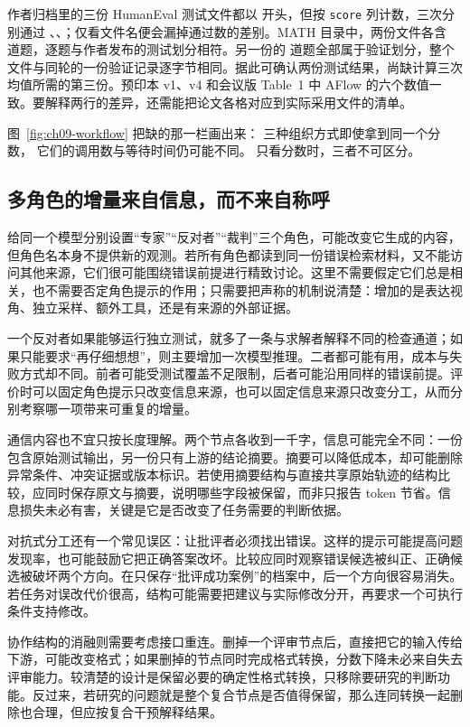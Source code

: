 作者归档里的三份 HumanEval 测试文件都以  开头，但按 \texttt{score} 列计数，三次分别通过 、、；仅看文件名便会漏掉通过数的差别。MATH 目录中，两份文件各含  道题，逐题与作者发布的测试划分相符。另一份的  道题全部属于验证划分，整个文件与同轮的一份验证记录逐字节相同。据此可确认两份测试结果，尚缺计算三次均值所需的第三份。预印本 v1、v4 和会议版 Table~1 中 AFlow 的六个数值一致。要解释两行的差异，还需能把论文各格对应到实际采用文件的清单\cite{aflow-2410,aflow-code-2025}。



图~\ref{fig:ch09-workflow} 把缺的那一栏画出来：
三种组织方式即使拿到同一个分数，
它们的调用数与等待时间仍可能不同。
只看分数时，三者不可区分。


\subsection{多角色的增量来自信息，而不来自称呼}
\label{sec:ch09-roleinformation}

给同一个模型分别设置“专家”“反对者”“裁判”三个角色，可能改变它生成的内容，但角色名本身不提供新的观测。若所有角色都读到同一份错误检索材料，又不能访问其他来源，它们很可能围绕错误前提进行精致讨论。这里不需要假定它们总是相关，也不需要否定角色提示的作用；只需要把声称的机制说清楚：增加的是表达视角、独立采样、额外工具，还是有来源的外部证据。

一个反对者如果能够运行独立测试，就多了一条与求解者解释不同的检查通道；如果只能要求“再仔细想想”，则主要增加一次模型推理。二者都可能有用，成本与失败方式却不同。前者可能受测试覆盖不足限制，后者可能沿用同样的错误前提。评价时可以固定角色提示只改变信息来源，也可以固定信息来源只改变分工，从而分别考察哪一项带来可重复的增量。

通信内容也不宜只按长度理解。两个节点各收到一千字，信息可能完全不同：一份包含原始测试输出，另一份只有上游的结论摘要。摘要可以降低成本，却可能删除异常条件、冲突证据或版本标识。若使用摘要结构与直接共享原始轨迹的结构比较，应同时保存原文与摘要，说明哪些字段被保留，而非只报告 token 节省。信息损失未必有害，关键是它是否改变了任务需要的判断依据。

对抗式分工还有一个常见误区：让批评者必须找出错误。这样的提示可能提高问题发现率，也可能鼓励它把正确答案改坏。比较应同时观察错误候选被纠正、正确候选被破坏两个方向。在只保存“批评成功案例”的档案中，后一个方向很容易消失。若任务对误改代价很高，结构可能需要把建议与实际修改分开，再要求一个可执行条件支持修改。

协作结构的消融则需要考虑接口重连。删掉一个评审节点后，直接把它的输入传给下游，可能改变格式；如果删掉的节点同时完成格式转换，分数下降未必来自失去评审能力。较清楚的设计是保留必要的确定性格式转换，只移除要研究的判断功能。反过来，若研究的问题就是整个复合节点是否值得保留，那么连同转换一起删除也合理，但应按复合干预解释结果。

